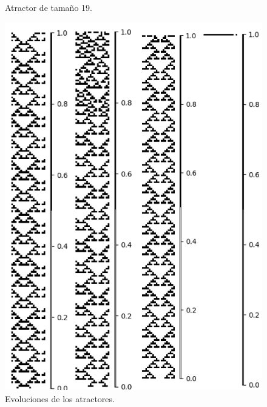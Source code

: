 \documentclass[11pt]{article}
\begin{document}
\begin{figure}[H]
			\caption{Atractor de tamaño 19.}\label{fig:picture}
			\end{figure}
			\begin{figure}[H]
			\centering
			\includegraphics[scale=0.3]{resources/Atractores22/atractor_22_size_19_res.png}
			\caption{Evoluciones de los atractores.}\label{fig:picture}
			\end{figure}
\end{document}
